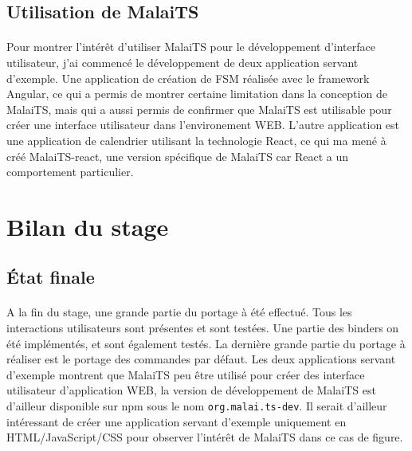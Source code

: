 \documentclass[11pt, a4paper, pdftex]{article}
\newcommand{\info}{\texttt}
\begin{document}
        \subsection{Utilisation de MalaiTS}\label{subsec:travexem}
            \paragraph{}
                Pour montrer l'intérêt d'utiliser MalaiTS pour le développement d'interface utilisateur, j'ai commencé le développement de deux application servant d'exemple.
                Une application de création de FSM réalisée avec le framework Angular, ce qui a permis de montrer certaine limitation dans la conception de MalaiTS,
                mais qui a aussi permis de confirmer que MalaiTS est utilisable pour créer une interface utilisateur dans l'environement WEB\@.
                L'autre application est une application de calendrier utilisant la technologie React, ce qui ma mené à créé MalaiTS-react, une version spécifique de MalaiTS car React a un comportement particulier.

    \newpage
    \section{Bilan du stage}\label{sec:bilsta}
        \subsection{État finale}\label{subsec:etatfin}
            \paragraph{}
                A la fin du stage, une grande partie du portage à été effectué.
                Tous les interactions utilisateurs sont présentes et sont testées.
                Une partie des binders on été implémentés, et sont également testés.
                La dernière grande partie du portage à réaliser est le portage des commandes par défaut.
                Les deux applications servant d'exemple montrent que MalaiTS peu être utilisé pour créer des interface utilisateur d'application WEB, la version de développement de MalaiTS est d'ailleur disponible sur npm sous le nom \info{org.malai.ts-dev}.
                Il serait d'ailleur intéressant de créer une application servant d'exemple uniquement en HTML/JavaScript/CSS pour observer l'intérêt de MalaiTS dans ce cas de figure.
\end{document}
